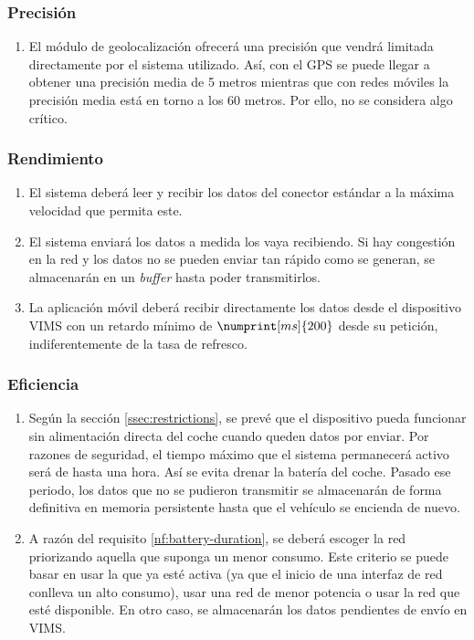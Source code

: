 \subsubsection{Precisión}
\begin{enumerate}[label=\textbf{\texttt{RNF-\arabic*}}]
  \item\label{nf:accuracy} El módulo de geolocalización ofrecerá una precisión
  que vendrá limitada directamente por el sistema utilizado. Así, con el GPS se
  puede llegar a obtener una precisión media de 5 metros mientras que con redes
  móviles la precisión media está en torno a los 60 metros. Por ello, no se considera algo crítico.
\end{enumerate}

\subsubsection{Rendimiento}
\begin{enumerate}[resume, label=\textbf{\texttt{RNF-\arabic*}}]
  \item\label{nf:read-speed} El sistema deberá leer y recibir los datos del
  conector estándar a la máxima velocidad que permita este.
  \item\label{nf:transmission-speed} El sistema enviará los datos a medida los
  vaya recibiendo. Si hay congestión en la red y los datos no se pueden enviar tan
  rápido como se generan, se almacenarán en un \textit{buffer} hasta poder transmitirlos.
  \item\label{nf:rt-viewer} La aplicación móvil deberá recibir directamente los
  datos desde el dispositivo \ac{VIMS} con un retardo mínimo de $\numprint[ms]{200}$
  desde su petición, indiferentemente de la tasa de refresco.
\end{enumerate}


\subsubsection{Eficiencia}
\begin{enumerate}[resume, label=\textbf{\texttt{RNF-\arabic*}}]
  \item\label{nf:battery-duration} Según la sección \ref{ssec:restrictions},
  se prevé que el dispositivo pueda funcionar sin alimentación directa del coche
  cuando queden datos por enviar. Por razones de seguridad, el tiempo máximo que
  el sistema permanecerá activo será de hasta una hora. Así se evita drenar la
  batería del coche. Pasado ese periodo, los datos que no se pudieron transmitir
  se almacenarán de forma definitiva en memoria persistente hasta que el vehículo
  se encienda de nuevo.
  \item\label{nf:network-election} A razón del requisito \ref{nf:battery-duration},
  se deberá escoger la red priorizando aquella que suponga un menor consumo. Este
  criterio se puede basar en usar la que ya esté activa (ya que el inicio de una
  interfaz de red conlleva un alto consumo), usar una red de menor potencia o
  usar la red que esté disponible. En otro caso, se almacenarán los datos pendientes
  de envío en \ac{VIMS}.
\end{enumerate}


